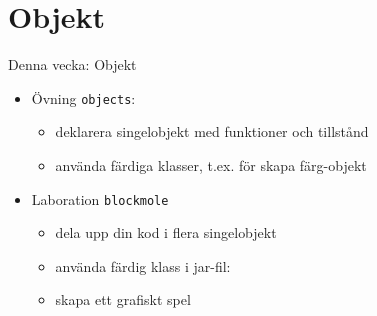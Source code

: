 \documentclass{lecturenotes}
\renewcommand{\vecka}{4}
\newcommand{\veckotema}{Objekt}
\begin{document}
\frame{\titlepage}
\setnextsection{\vecka}
\section[Vecka \vecka: \veckotema]{\veckotema}
\frame{\tableofcontents}

\ifkompendium\else
\begin{Slide}{Denna vecka: Objekt}
\begin{itemize}
\item Övning \texttt{objects}:
\begin{itemize}
\item deklarera singelobjekt med funktioner och tillstånd
\item använda färdiga klasser, t.ex.  för skapa färg-objekt
\end{itemize}

\item Laboration \texttt{blockmole}
\begin{itemize}
  \item dela upp din kod i flera singelobjekt
  \item använda färdig klass i jar-fil: 
  \item skapa ett grafiskt spel
\end{itemize}
\end{itemize}
\end{Slide}
\fi


\end{document}
